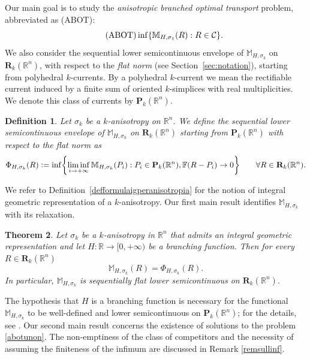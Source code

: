 \documentclass{article}
\numberwithin{equation}{section}
\theoremstyle{plain}%
\newtheorem{theorem}{Theorem}[section]
\newtheorem{defin}[theorem]{Definition}
\theoremstyle{definition}
\theoremstyle{definition}
\newcommand{\graffas}{\biggl\{}
\newcommand{\graffad}{\biggr\}}
\newcommand{\rgrande}{\mathbb{R}}
\newcommand{\corrett}{\mathbf{R}_k(\rgrande^n)}
\newcommand{\correttvar}[2]{\mathbf{R}_{#1}(\rgrande^{#2})}
\newcommand{\corrpol}{\mathbf{P}_k(\rgrande^n)}
\newcommand{\normaflat}{\mathbb{F}}
\newcommand{\massaanisotropa}{\mathbb{M}_{H,\sigma_k}}
\newcommand{\massaanisotropauno}{\mathbb{M}_{H,\sigma_1}}
\newcommand{\rilassato}{\Phi_{H, \sigma_k}}
\begin{document}
Our main goal is to study the \emph{anisotropic branched optimal transport} problem, abbreviated as \textnormal{(ABOT)}:
\begin{equation}\label{abotunon}\tag{$\text{ABOT}$}
    \inf \{ \massaanisotropauno(R) : R \in \mathcal{C} \}
    \text{.}
\end{equation}
We also consider the sequential lower semicontinuous envelope of $\massaanisotropa$ on $\correttvar{k}{n}$, with respect to the \emph{flat norm} (see Section~\ref{sec:notation}), starting from polyhedral $k$-currents. By a polyhedral $k$-current we mean the rectifiable current induced by a finite sum of oriented $k$-simplices with real multiplicities. We denote this class of currents by $\mathbf{P}_k(\rgrande^n)$.

\begin{defin}\label{defrilassato}
    Let $\sigma_k$ be a $k$-anisotropy on $\rgrande^n$. We define the sequential lower semicontinuous envelope of ${\massaanisotropa}$ on $\correttvar{k}{n}$ starting from $\corrpol$ with respect to the flat norm as
    \begin{equation}\label{eqdefrilassato}
        \rilassato (R) \vcentcolon = \inf \graffas
        \liminf_{i \to +\infty} \massaanisotropa (P_i): P_i \in \corrpol, \normaflat(R - P_i) \to 0
        \graffad
        \qquad
        \forall R \in \corrett
        \text{.}
    \end{equation}
\end{defin}

We refer to Definition~\ref{defformulaigperanisotropia} for the notion of integral geometric representation of a $k$-anisotropy. Our first main result identifies $\massaanisotropa$ with its relaxation. 

\begin{theorem}\label{thuguaglianza}
    Let $\sigma_k$ be a $k$-anisotropy in $\rgrande^n$ that admits an integral geometric representation and let $H: \rgrande \to [ 0,+ \infty)$ be a branching function. Then for every  $R \in \corrett$
    \begin{equation*}
        \massaanisotropa(R) = \rilassato (R)
        \text{.}
    \end{equation*}
    In particular, $\massaanisotropa$ is sequentially flat lower semicontinuous on $\corrett$.
\end{theorem}

The hypothesis that $H$ is a branching function is necessary for the functional $\massaanisotropa$ to be well-defined and lower semicontinuous on $\corrpol$; for the details, see \cite{cdrms17}. Our second main result concerns the existence of solutions to the problem \eqref{abotunon}. The non-emptiness of the class of competitors and the necessity of assuming the finiteness of the infimum are discussed in Remark \ref{remsullinf}.
\end{document}
